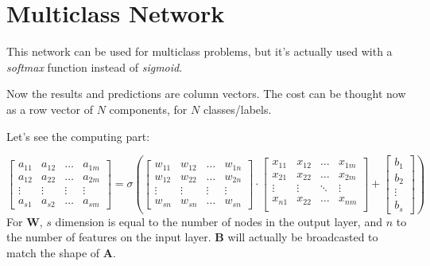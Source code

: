 \section{Multiclass Network}

This network can be used for multiclass problems, but it's actually used with a \textit{softmax} function instead of \textit{sigmoid}. 

Now the results and predictions are column vectors. The cost can be thought now as a row vector of $N$ components, for $N$ classes/labels.

Let's see the computing part:

\begin{equation*}
  \begin{bmatrix}
    a_{11} & a_{12}& \ldots& a_{1m}\\ 
    a_{12} & a_{22}& \ldots& a_{2m}\\ 
    \vdots & \vdots & \vdots& \vdots\\ 
    a_{s1} & a_{s2}& \ldots& a_{sm} 
  \end{bmatrix}
    =\sigma( 
  \begin{bmatrix}
    w_{11} & w_{12}& \ldots& w_{1n}\\ 
    w_{12} & w_{22}& \ldots& w_{2n}\\ 
    \vdots & \vdots & \vdots& \vdots\\ 
    w_{sn} & w_{sn}& \ldots& w_{sn} 
  \end{bmatrix}
  \cdot{}
  \begin{bmatrix}
    x_{11} & x_{12} & \ldots & x_{1m}\\
    x_{21} & x_{22} & \ldots & x_{2m}\\
    \vdots & \vdots & \ddots & \vdots\\
    x_{n1} & x_{22} & \ldots & x_{nm}\\
  \end{bmatrix}
  +
  \begin{bmatrix}
    b_1\\ b_2\\ \vdots\\ b_s
  \end{bmatrix})
\end{equation*}
For $\mathbf{W}$, $s$ dimension is equal to the number of nodes in the output layer, and $n$ to the number of features on the input layer. $\mathbf{B}$ will actually be broadcasted to match the shape of $\mathbf{A}$. 

